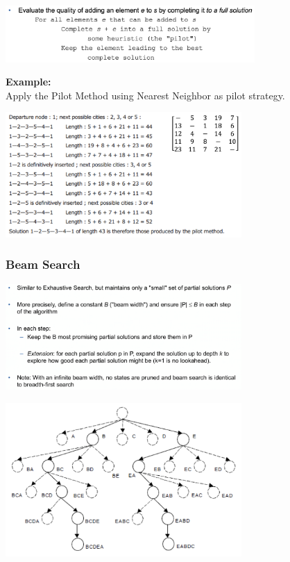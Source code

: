 \documentclass[10pt,a4paper,twocolumn]{article}
\begin{document}
\begin{center}
\includegraphics[width=9.5cm]{images/pilot-method}
\end{center}

\textbf{Example:}\\
Apply the Pilot Method using Nearest Neighbor as pilot strategy.

\begin{center}
\includegraphics[width=9cm]{images/pilot-method-example}
\end{center}

\subsubsection{Beam Search}
\begin{center}
\includegraphics[width=9cm]{images/beam-search}
\end{center}

\begin{center}
\includegraphics[width=9cm]{images/beam-search-example}
\end{center}
\end{document}

